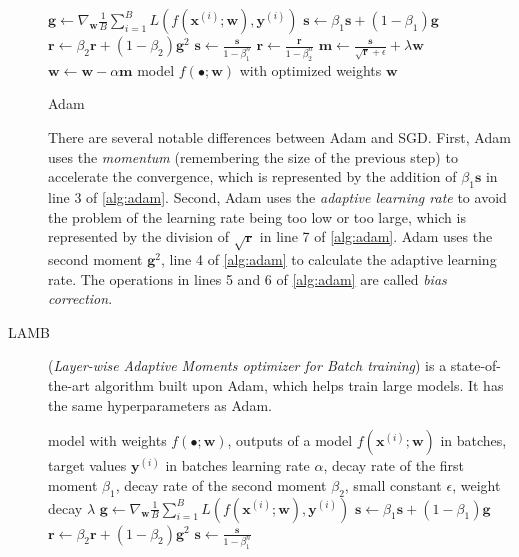 \begin{description}
\begin{algorithm}
\begin{algorithmic}[1]
            \State $\pmb{g} \gets \nabla_{\pmb{w}} \frac1B \sum_{i=1}^B L(f(\pmb{x}^{(i)};\pmb{w}),\pmb{y}^{(i)})$
            \State $\pmb{s} \gets \beta_1 \pmb{s} + (1 - \beta_1) \pmb{g}$
            \State $\pmb{r} \gets \beta_2 \pmb{r} + (1 - \beta_2) \pmb{g}^2$
            \State $\pmb{s} \gets \frac{\pmb{s}}{1 - \beta_1^n}$
            \State $\pmb{r} \gets \frac{\pmb{r}}{1 - \beta_2^n}$
            \State $\pmb{m} \gets \frac{\pmb{s}}{\sqrt{\pmb{r}} + \epsilon} + \lambda \pmb{w}$
            \State $\pmb{w} \gets \pmb{w} - \alpha \pmb{m}$
        \EndFor
        \Ensure model $f(\bullet;\pmb{w})$ with optimized weights $\pmb{w}$
        \end{algorithmic}
        \caption{Adam}
        \label{alg:adam}
    \end{algorithm}
    There are several notable differences between Adam and SGD.
    First, Adam uses the \emph{momentum} (remembering the size of the previous step) to accelerate the convergence, which is represented by the addition of $\beta_1\pmb{s}$ in line 3 of \cref{alg:adam}.
    Second, Adam uses the \emph{adaptive learning rate} to avoid the problem of the learning rate being too low or too large, which is represented by the division of $\sqrt{\pmb{r}}$ in line 7 of \cref{alg:adam}.
    Adam uses the second moment $\pmb{g}^2$, line 4 of \cref{alg:adam} to calculate the adaptive learning rate.
    The operations in lines 5 and 6 of \cref{alg:adam} are called \emph{bias correction}.
    \item[LAMB] (\emph{Layer-wise Adaptive Moments optimizer for Batch training}) \cite{lamb} is a state-of-the-art \dl algorithm built upon Adam, which helps train large models.
    It has the same hyperparameters as Adam.
    \begin{algorithm}
        \begin{algorithmic}[1]
        \Require model with weights $f(\bullet;\pmb{w})$, outputs of a model $f(\pmb{x}^{(i)};\pmb{w})$ in batches, target values $\pmb{y}^{(i)}$ in batches
        \Require learning rate $\alpha$, decay rate of the first moment $\beta_1$, decay rate of the second moment $\beta_2$, small constant $\epsilon$, weight decay $\lambda$
            \State $\pmb{g} \gets \nabla_{\pmb{w}} \frac1B \sum_{i=1}^B L(f(\pmb{x}^{(i)};\pmb{w}),\pmb{y}^{(i)})$
            \State $\pmb{s} \gets \beta_1 \pmb{s} + (1 - \beta_1) \pmb{g}$
            \State $\pmb{r} \gets \beta_2 \pmb{r} + (1 - \beta_2) \pmb{g}^2$
            \State $\pmb{s} \gets \frac{\pmb{s}}{1 - \beta_1^n}$

\end{algorithmic}
\end{algorithm}
\end{description}
